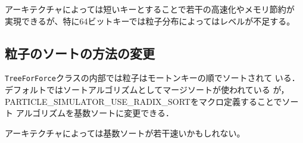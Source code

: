 アーキテクチャによっては短いキーとすることで若干の高速化やメモリ節約が
実現できるが、特に64ビットキーでは粒子分布によってはレベルが不足する。

\subsection{粒子のソートの方法の変更}
\label{sec:compile_sort_method}

{\tt TreeForForce}クラスの内部では粒子はモートンキーの順でソートされて
いる．デフォルトではソートアルゴリズムとしてマージソートが使われている
が，PARTICLE\_SIMULATOR\_USE\_RADIX\_SORTをマクロ定義することでソート
アルゴリズムを基数ソートに変更できる．

アーキテクチャによっては基数ソートが若干速いかもしれない。



